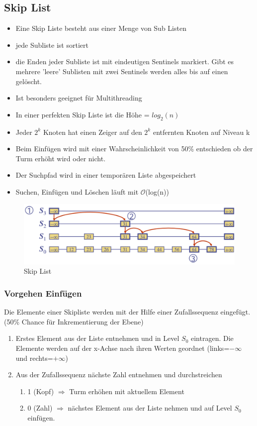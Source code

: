\subsection{Skip List}
\begin{itemize}
	\item Eine Skip Liste besteht aus einer Menge von Sub Listen
	\item jede Subliste ist sortiert
	\item die Enden jeder Subliste ist mit eindeutigen Sentinels markiert. Gibt es mehrere 'leere' Sublisten mit zwei Sentinels werden alles bis auf einen gelöscht.
	\item Ist besonders geeignet für Multithreading
	\item In einer perfekten Skip Liste ist die Höhe = $log_2(n)$
	\item Jeder $2^k$ Knoten hat einen Zeiger auf den $2^k$ entfernten Knoten auf Niveau k
	\item Beim Einfügen wird mit einer Wahrscheinlichkeit von 50\% entschieden ob der Turm erhöht wird oder nicht.
	\item Der Suchpfad wird in einer temporären Liste abgespeichert
	\item Suchen, Einfügen und Löschen läuft mit $\mathcal{O}$(log(n))
\end{itemize}
\begin{figure}[h]
	\centering
	\includegraphics[width=0.8\linewidth]{images/skip_list}
	\caption{Skip List}
\end{figure}

\subsubsection{Vorgehen Einfügen}
Die Elemente einer Skipliste werden mit der Hilfe einer Zufallssequenz eingefügt. (50\% Chance für Inkrementierung der Ebene)
\begin{enumerate}
	\item Erstes Element aus der Liste entnehmen und in Level $S_0$ eintragen. Die Elemente werden auf der x-Achse nach ihren Werten geordnet (links=$-\infty$ und rechts=$+\infty$)
	\item Aus der Zufallssequenz nächste Zahl entnehmen und durchstreichen
	\begin{enumerate}
		\item 1 (Kopf) $\Rightarrow$ Turm erhöhen mit aktuellem Element
		\item 0 (Zahl) $\Rightarrow$ nächstes Element aus der Liste nehmen und auf Level $S_0$ einfügen.
	\end{enumerate}
\end{enumerate}

